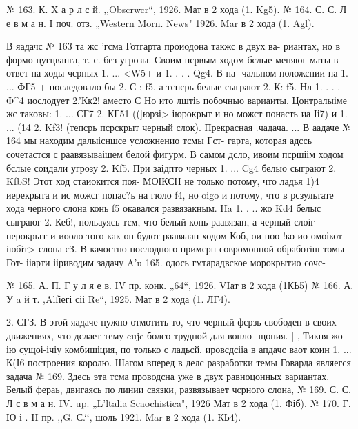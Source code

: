 № 163. К. X а р л с й. ,,Obscrwcr“, 1926.
Мат в 2 хода (1. Kg5).
	№ 164. С. С. Л е в м а н.
I поч. отз. „Western Morn. News" 1926.
Mar в 2 хода (1. Agl).


    В яадачс № 163 та жс 'гсма Готгарта проиодона такжс в двух ва- риантах, но в формо цугцванга, т. с. без угрозы. Своим псрвым ходом бслые меняюг маты в ответ на ходы чсрных 1. ... <W5+ и 1. . . . Qg4. В на- чальном положснии на 1. ... ФГ5 + последовало бы 2. С : f5, а тспсрь белые сыграют 2. К: f5. Нл 1. . . . Ф^4 иослодует 2.’Кк2! аместо С Но ито лштіь побочныо вариаиты. Цонтралыіме жс таковы: 1. ... СГ7
2. КГ51 ((]юрзі> іюрокрыт и но можст понасть иа Іі7) и 1. ... (14 2. Kf3! (тепсрь псрскрыт черный слок). Прекрасная .чадача. ...
      В аадаче № 164 мы находим далыісншсе усложненио тсмы Гст- гарта, которая адссь сочетастся с раавязываішем белой фигурм. В самом дсло, ивоим псршіім ходом бслые соидали угрозу 2. Kf5. При заідпто черных 1. ... Cg4 белыо сыграют 2. KfbS! Этот ход стаиокится поя- МОІКСН не только потому, что ладья 1)4 иерекрыта и ис можсг попас?ь
на гюло f4, но oigo и потому, что в рсзультате хода черного слона конь f5 окавался развязакным. Ha 1. . .. жо Kd4 белыс сыграюг 2. Кеб!, польауясь тсм, что белый конь раавязан, а черный слоіг перокрьгг и иооло того как он будот раавяаан ходом Коб, ои поо !ко ио омоікот іюбіт> слона сЗ.
В качостпо послодного примсрп совромонной обработіш томы Гот- ііарти ііриводим задачу A'u 165. одось гмтарадвское морокрытио сочс-

№ 165. А. П. Г у л я е в.
IV пр. конк. „64“, 1926.
VIат в 2 хода (1КЬ5)	№ 166. А. У a й т.
,Alfіегі сіі Re“, 1925.
Мат в 2 хода (1. ЛГ4).


2. СГЗ. В этой яадаче нужно отмотить то, что черный фсрзь свободен в своих движениях, что дслает тему euje болсо трудной для вопло- щония. |	,
Тикпя жо ію сущоі-ічіу комбишіция, по только с ладьсй, ировсдсііа
в апдачс ваот коин
1. ... К(І6 построения королю.
    Шагом вперед в делс разработки темы Говарда являегся задача № 169. Здесь эта тсма проводсна уже в двух равноцонных вариантах. Белый фераь, двигаясь по линии связки, развязывает чсрного слона,
№ 169. С. С. Л с в м а н.
IV. up. „L’ltalia Scaochistica", 1926
Мат в 2 хода (1. Фіб).
	№ 170. Г. Ю і
. II пр. ,,G. С.‘‘, шоль 1921.
Mar в 2 хода (1. КЬ4).


